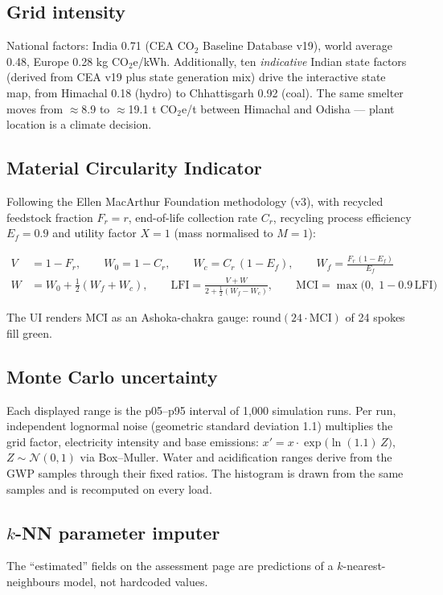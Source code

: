 \documentclass[11pt,a4paper]{article}
\begin{document}
\subsection{Grid intensity}
National factors: India 0.71 (CEA CO$_2$ Baseline Database v19), world average 0.48,
Europe 0.28 kg CO$_2$e/kWh. Additionally, ten \emph{indicative} Indian state factors
(derived from CEA v19 plus state generation mix) drive the interactive state map, from
Himachal 0.18 (hydro) to Chhattisgarh 0.92 (coal). The same smelter moves from
$\approx$8.9 to $\approx$19.1 t CO$_2$e/t between Himachal and Odisha --- plant location is
a climate decision.

\subsection{Material Circularity Indicator}
Following the Ellen MacArthur Foundation methodology (v3), with recycled feedstock fraction
$F_r = r$, end-of-life collection rate $C_r$, recycling process efficiency $E_f = 0.9$ and
utility factor $X = 1$ (mass normalised to $M=1$):

\begin{align}
V &= 1 - F_r, \qquad W_0 = 1 - C_r, \qquad W_c = C_r\,(1-E_f), \qquad W_f = \frac{F_r\,(1-E_f)}{E_f}\\
W &= W_0 + \tfrac{1}{2}(W_f + W_c), \qquad
\mathrm{LFI} = \frac{V + W}{2 + \tfrac{1}{2}(W_f - W_c)}, \qquad
\mathrm{MCI} = \max\!\big(0,\; 1 - 0.9\,\mathrm{LFI}\big)
\end{align}

The UI renders MCI as an Ashoka-chakra gauge: $\mathrm{round}(24 \cdot \mathrm{MCI})$ of 24
spokes fill green.

\subsection{Monte Carlo uncertainty}
Each displayed range is the p05--p95 interval of 1{,}000 simulation runs. Per run,
independent lognormal noise (geometric standard deviation 1.1) multiplies the grid factor,
electricity intensity and base emissions:
$x' = x \cdot \exp\!\big(\ln(1.1)\, Z\big)$, $Z \sim \mathcal{N}(0,1)$ via Box--Muller.
Water and acidification ranges derive from the GWP samples through their fixed ratios. The
histogram is drawn from the same samples and is recomputed on every load.

\subsection{$k$-NN parameter imputer}
The ``estimated'' fields on the assessment page are predictions of a $k$-nearest-neighbours
model, not hardcoded values.
\end{document}
